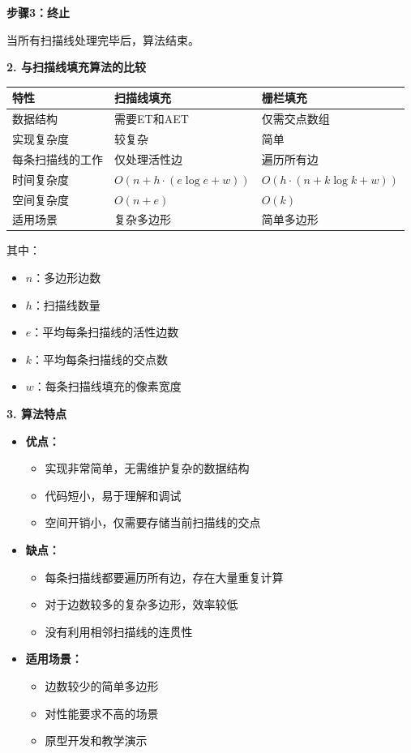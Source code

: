 ﻿\documentclass[12pt,a4paper]{article}
\begin{document}
\begin{tcolorbox}[breakable]
\textbf{步骤3：终止}

当所有扫描线处理完毕后，算法结束。

\textbf{2. 与扫描线填充算法的比较}

\begin{center}
\begin{tabular}{|l|l|l|}
\hline
\textbf{特性} & \textbf{扫描线填充} & \textbf{栅栏填充} \\
\hline
数据结构 & 需要ET和AET & 仅需交点数组 \\
\hline
实现复杂度 & 较复杂 & 简单 \\
\hline
每条扫描线的工作 & 仅处理活性边 & 遍历所有边 \\
\hline
时间复杂度 & $O(n + h \cdot (e \log e + w))$ & $O(h \cdot (n + k \log k + w))$ \\
\hline
空间复杂度 & $O(n + e)$ & $O(k)$ \\
\hline
适用场景 & 复杂多边形 & 简单多边形 \\
\hline
\end{tabular}
\end{center}

其中：
\begin{itemize}
\item $n$：多边形边数
\item $h$：扫描线数量
\item $e$：平均每条扫描线的活性边数
\item $k$：平均每条扫描线的交点数
\item $w$：每条扫描线填充的像素宽度
\end{itemize}

\textbf{3. 算法特点}

\begin{itemize}
\item \textbf{优点：}
  \begin{itemize}
  \item 实现非常简单，无需维护复杂的数据结构
  \item 代码短小，易于理解和调试
  \item 空间开销小，仅需要存储当前扫描线的交点
  \end{itemize}
\item \textbf{缺点：}
  \begin{itemize}
  \item 每条扫描线都要遍历所有边，存在大量重复计算
  \item 对于边数较多的复杂多边形，效率较低
  \item 没有利用相邻扫描线的连贯性
  \end{itemize}
\item \textbf{适用场景：}
  \begin{itemize}
  \item 边数较少的简单多边形
  \item 对性能要求不高的场景
  \item 原型开发和教学演示
  \end{itemize}
\end{itemize}


\end{tcolorbox}
\end{document}
